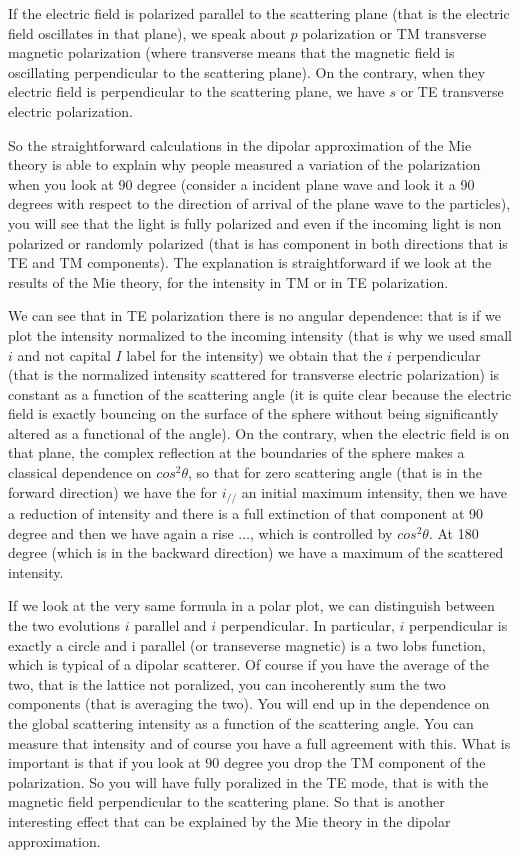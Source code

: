 \documentclass[../main/main.tex]{subfiles}
\begin{document}
If the electric field is polarized parallel to the scattering plane (that is the electric field oscillates in that plane), we speak about $p$ polarization or TM transverse magnetic polarization (where transverse means that the magnetic field is oscillating perpendicular to the scattering plane). On the contrary, when they electric field is perpendicular to the scattering plane, we have $s$ or TE transverse electric polarization.

So the straightforward calculations in the dipolar approximation of the Mie theory is able to explain why people measured a variation of the polarization when you look at 90 degree (consider a incident plane wave and look it a 90 degrees with respect to the direction of arrival of the plane wave to the particles), you will see that the light is fully polarized and even if the incoming light is non polarized or randomly polarized (that is has component in both directions that is TE and TM components).
The explanation is straightforward if we look at the results of the Mie theory, for the intensity in TM or in TE polarization.

We can see that in TE polarization there is no angular dependence: that is if we plot the intensity normalized to the incoming intensity (that is why we used small \( i \) and not capital \( I \) label for the intensity) we obtain that the \( i \) perpendicular (that is the normalized intensity scattered for transverse electric polarization) is constant as a function of the scattering angle (it is quite clear because the electric field is exactly bouncing on the surface of the sphere without being significantly altered as a functional of the angle).
On the contrary, when the electric field is on that plane, the complex reflection at the boundaries of the sphere makes a classical dependence on $cos^2 \theta$, so that for zero scattering angle (that is in the forward direction) we have the for \( i_{//} \) an initial maximum intensity, then we have a reduction of intensity and there is a full extinction of that component at 90 degree and then we have again a rise \( \dots \), which is controlled by $cos^2 \theta$. At 180 degree (which is in the backward direction) we have a maximum of the scattered intensity.

If we look at the very same formula in a polar plot, we can distinguish between the two evolutions \( i \) parallel and \( i \) perpendicular. In particular, \( i \) perpendicular is exactly a circle and i parallel (or transeverse magnetic) is a two lobs function, which is typical of a dipolar scatterer.
Of course if you have the average of the two, that is the lattice not poralized, you can incoherently sum the two components (that is averaging the two). You will end up in the dependence on the global scattering intensity as a function of the scattering angle. You can measure that intensity and of course you have a full agreement with this. What is important is that if you look at 90 degree you drop the TM component of the polarization. So you will have fully poralized in the TE mode, that is with the magnetic field perpendicular to the scattering plane.
So that is another interesting effect that can be explained by the Mie theory in the dipolar approximation.
\end{document}
